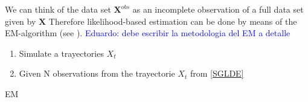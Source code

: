 \documentclass[12pt, reqno]{amsart}
\newcommand{\fer}[1]{{\textcolor{blue}{#1}}}
\newcommand{\1}{{\bf 1}}
\newcommand{\2}{{\bf 2}}
\theoremstyle{definition}
\theoremstyle{remark}
\numberwithin{equation}{section}
\begin{document}
 We can think of the data set $\bm{X}^{obs}$ as an incomplete observation of a full data set given by $\bm X$ Therefore likelihood-based estimation can be done by means of the EM-algorithm (see \cite{mc-kr-97}).
\fer{Eduardo: debe escribir la metodologia del EM a detalle}\\

\begin{algorithm}

 \begin{enumerate}
    \item Simulate a trayectories $X_t$ 
    \item Given N observations from the trayectorie $X_t$ from \ref{SGLDE}
\end{enumerate}
\caption{EM}\label{alg:EM}
\end{algorithm}





  
  
 
\end{document}
